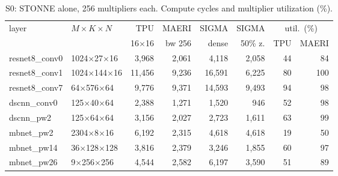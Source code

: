 \begin{table}[t]\centering\scriptsize\setlength{\tabcolsep}{2pt}
\caption{S0: STONNE alone, 256 multipliers each. Compute cycles and multiplier utilization (\%).}\label{tab:stonne}
\begin{tabular}{@{}llrrrrrr@{}}\toprule
layer & $M{\times}K{\times}N$ & TPU & MAERI & SIGMA & SIGMA & \multicolumn{2}{c}{util.\ (\%)}\\
 & & 16$\times$16 & bw 256 & dense & 50\% z. & TPU & MAERI\\\midrule
resnet8\_conv0 & 1024$\times$27$\times$16 & 3{,}968 & 2{,}061 & 4{,}118 & 2{,}058 & 44 & 84 \\
resnet8\_conv1 & 1024$\times$144$\times$16 & 11{,}456 & 9{,}236 & 16{,}591 & 6{,}225 & 80 & 100 \\
resnet8\_conv7 & 64$\times$576$\times$64 & 9{,}776 & 9{,}371 & 14{,}593 & 9{,}493 & 94 & 98 \\
dscnn\_conv0 & 125$\times$40$\times$64 & 2{,}388 & 1{,}271 & 1{,}520 & 946 & 52 & 98 \\
dscnn\_pw2 & 125$\times$64$\times$64 & 3{,}156 & 2{,}027 & 2{,}723 & 1{,}611 & 63 & 99 \\
mbnet\_pw2 & 2304$\times$8$\times$16 & 6{,}192 & 2{,}315 & 4{,}618 & 4{,}618 & 19 & 50 \\
mbnet\_pw14 & 36$\times$128$\times$128 & 3{,}816 & 2{,}379 & 3{,}246 & 1{,}855 & 60 & 97 \\
mbnet\_pw26 & 9$\times$256$\times$256 & 4{,}544 & 2{,}582 & 6{,}197 & 3{,}590 & 51 & 89 \\
\bottomrule\end{tabular}\end{table}
